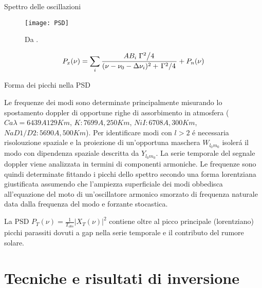 \documentclass[10pt,xcolor={usenames},fleqn,mathserif,serif]{beamer}
\begin{document}
\begin{frame}{Spettro delle oscillazioni}

\begin{figure}[!ht]


\texttt{[image: PSD]}
\caption{Da \cite{houdek2006stochastic}.}\label{fig:PSD}

\end{figure}

\begin{equation}
P_x(\nu)=\sum_i\frac{AB_i\left.{\Gamma^2}\middle/{4}\right.}{(\nu-\nu_0-\Delta\nu_i)^2+\left.{\Gamma^2}\middle/{4}\right.}+P_n(\nu)
\end{equation}

\end{frame}

\begin{wordonframe}{Forma dei picchi nella PSD}

Le frequenze dei modi sono determinate principalmente misurando lo spostamento doppler di opportune righe di assorbimento in atmosfera ($Ca \lambda=6439 A 129 Km$, $K: 7699 A, 250Km$, $Ni I: 6708 A,300 Km$, $Na D1/D2: 5690 A, 500 Km$). Per identificare modi con $l>2$ \'e necessaria risolouzione spaziale e la proiezione di un'opportuna maschera $W_{l_0m_0}$ isoler\'a il modo con dipendenza spaziale descritta da $Y_{l_0m_0}$. La serie temporale del segnale doppler viene analizzata in termini di componenti armoniche. Le frequenze sono quindi determinate fittando i picchi dello spettro secondo una forma lorentziana  giustificata assumendo che l'ampiezza superficiale dei modi obbedisca all'equazione del moto di un'oscillatore armonico smorzato di frequenza naturale data dalla frequenza del modo e forzante stocastica.

La PSD $P_T(\nu)=\frac{1}{T_{obs}}|X_T(\nu)|^2$ contiene oltre al picco principale (lorentziano) picchi parassiti dovuti a gap nella serie temporale e il contributo del rumore solare.

\end{wordonframe}


\part{Tecniche e risultati di inversione}\label{part:inverseproblem}
\end{document}
